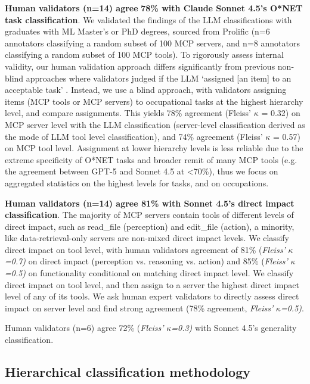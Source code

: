 \documentclass[manuscript,screen,nonacm,oneside]{acmart}
\begin{document}
\textbf{Human validators (n=14) agree} \textbf{78\% with Claude Sonnet 4.5's O*NET task classification}. We validated the findings of the LLM classifications with graduates with ML Master's or PhD degrees, sourced from Prolific (n=6 annotators classifying a random subset of 100 MCP servers, and n=8 annotators classifying a random subset of 100 MCP tools). To rigorously assess internal validity, our human validation approach differs significantly from previous non-blind approaches where validators judged if the LLM `assigned {[}an item{]} to an acceptable task' \citep[see][supplementary materials]{handa2025which}. Instead, we use a blind approach, with validators assigning items (MCP tools or MCP servers) to occupational tasks at the highest hierarchy level, and compare assignments. This yields 78\% agreement (Fleiss' $\kappa$ = 0.32) on MCP server level with the LLM classification (server-level classification derived as the mode of LLM tool level classification), and 74\% agreement (Fleiss' $\kappa$ = 0.57) on MCP tool level. Assignment at lower hierarchy levels is less reliable due to the extreme specificity of O*NET tasks and broader remit of many MCP tools (e.g. the agreement between GPT-5 and Sonnet 4.5 at \textless70\%), thus we focus on aggregated statistics on the highest levels for tasks, and on occupations.

\textbf{Human validators (n=14) agree 81\% with Sonnet 4.5's direct impact classification}. The majority of MCP servers contain tools of different levels of direct impact, such as read\_file (perception) and edit\_file (action), a minority, like data-retrieval-only servers are non-mixed direct impact levels. We classify direct impact on tool level, with human validators agreement of 81\% (\emph{Fleiss'} \(\kappa\)\emph{=0.7)} on direct impact (perception vs. reasoning vs. action) and 85\% (\emph{Fleiss'} \(\kappa\)\emph{=0.5)} on functionality conditional on matching direct impact level. We classify direct impact on tool level, and then assign to a server the highest direct impact level of any of its tools. We ask human expert validators to directly assess direct impact on server level and find strong agreement (78\% agreement, \emph{Fleiss'} \(\kappa\)\emph{=0.5)}.

Human validators (n=6) agree 72\% (\emph{Fleiss'} \(\kappa\)\emph{=0.3)} with Sonnet 4.5's generality classification.

\subsection{Hierarchical classification methodology}
\label{app:hierarchy}
\end{document}
